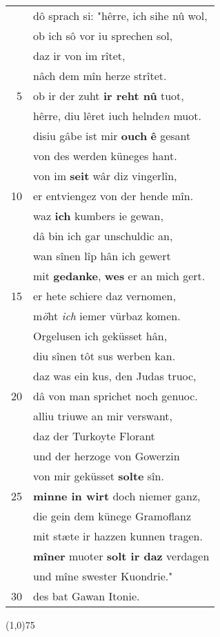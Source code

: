\documentclass[8pt,a4paper,notitlepage]{article}
\begin{document}
\begin{table}[ht]
\begin{minipage}[t]{0.5\linewidth}
\begin{tabular}{rl}
 & dô sprach si: "hêrre, ich sihe nû wol,\\ 
 & ob ich sô vor iu sprechen sol,\\ 
 & daz ir von im rîtet,\\ 
 & nâch dem mîn herze strîtet.\\ 
5 & ob ir der zuht \textbf{ir reht nû} tuot,\\ 
 & hêrre, diu lêret iuch helnde\textit{n} muot.\\ 
 & disiu gâbe ist mir \textbf{ouch} \textbf{ê} gesant\\ 
 & von des werden küneges hant.\\ 
 & von im \textbf{seit} wâr diz vingerlîn,\\ 
10 & er entviengez von der hende mîn.\\ 
 & waz \textbf{ich} kumbers ie gewan,\\ 
 & dâ bin ich gar unschuldic an,\\ 
 & wan sînen lîp hân ich gewert\\ 
 & mit \textbf{gedanke}, \textbf{wes} er an mich gert.\\ 
15 & er hete schiere daz vernomen,\\ 
 & m\textit{ö}ht \textit{ich} iemer vürbaz komen.\\ 
 & Orgelusen ich geküsset hân,\\ 
 & diu sînen tôt sus werben kan.\\ 
 & daz was ein kus, den Judas truoc,\\ 
20 & dâ von man sprichet noch genuoc.\\ 
 & alliu triuwe an mir verswant,\\ 
 & daz der Turkoyte Florant\\ 
 & und der herzoge von Gowerzin\\ 
 & von mir geküsset \textbf{solte} sîn.\\ 
25 & \textbf{minne in wirt} doch niemer ganz,\\ 
 & die gein dem künege Gramoflanz\\ 
 & mit stæte ir hazzen kunnen tragen.\\ 
 & \textbf{mîner} muoter \textbf{solt ir daz} verdagen\\ 
 & und mîne swester Kuondrie."\\ 
30 & des bat Gawan Itonie.\\ 
\end{tabular}
\scriptsize
\line(1,0){75} \newline

\end{minipage}
\end{table}
\end{document}
